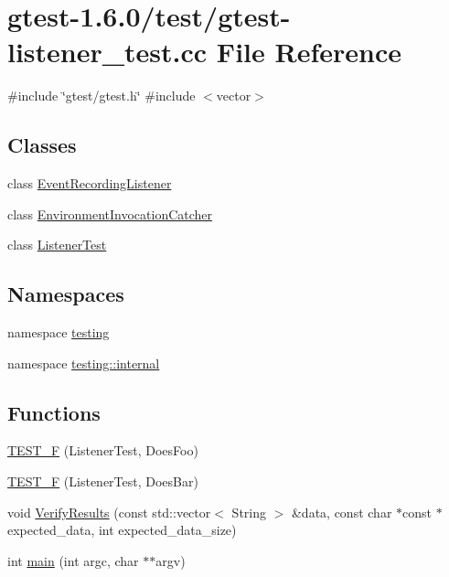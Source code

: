 \hypertarget{gtest-listener__test_8cc}{\section{gtest-\/1.6.0/test/gtest-\/listener\-\_\-test.cc \-File \-Reference}
\label{de/d83/gtest-listener__test_8cc}
}
{\ttfamily \#include \char`\"{}gtest/gtest.\-h\char`\"{}}\*
{\ttfamily \#include $<$vector$>$}\*
\subsection*{\-Classes}
\begin{DoxyCompactItemize}
\item 
class \hyperlink{classtesting_1_1internal_1_1EventRecordingListener}{\-Event\-Recording\-Listener}
\item 
class \hyperlink{classtesting_1_1internal_1_1EnvironmentInvocationCatcher}{\-Environment\-Invocation\-Catcher}
\item 
class \hyperlink{classtesting_1_1internal_1_1ListenerTest}{\-Listener\-Test}
\end{DoxyCompactItemize}
\subsection*{\-Namespaces}
\begin{DoxyCompactItemize}
\item 
namespace \hyperlink{namespacetesting}{testing}
\item 
namespace \hyperlink{namespacetesting_1_1internal}{testing\-::internal}
\end{DoxyCompactItemize}
\subsection*{\-Functions}
\begin{DoxyCompactItemize}
\item 
\hyperlink{namespacetesting_1_1internal_a7e113e9c70d45d89fe1703e58ff083b9}{\-T\-E\-S\-T\-\_\-\-F} (\-Listener\-Test, \-Does\-Foo)
\item 
\hyperlink{namespacetesting_1_1internal_a02cef32090020d164460dd3d9f8e2852}{\-T\-E\-S\-T\-\_\-\-F} (\-Listener\-Test, \-Does\-Bar)
\item 
void \hyperlink{gtest-listener__test_8cc_aaf03d11ca0b4a59d0fafe112a9259580}{\-Verify\-Results} (const std\-::vector$<$ \-String $>$ \&data, const char $\ast$const $\ast$expected\-\_\-data, int expected\-\_\-data\-\_\-size)
\item 
int \hyperlink{gtest-listener__test_8cc_a3c04138a5bfe5d72780bb7e82a18e627}{main} (int argc, char $\ast$$\ast$argv)
\end{DoxyCompactItemize}
